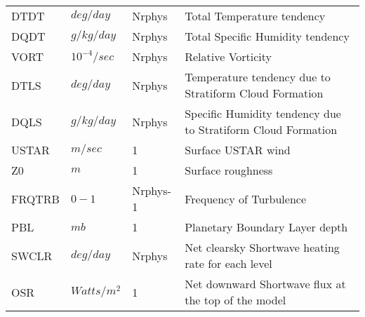 \begin{tabular}{llll}
 DTDT     &    $deg/day$ &  Nrphys
     &\begin{minipage}[t]{3in}
      {Total Temperature tendency}
     \end{minipage}\\
 DQDT     &    $g/kg/day$ &  Nrphys
     &\begin{minipage}[t]{3in}
      {Total Specific Humidity tendency}
     \end{minipage}\\
 VORT     &    $10^{-4}/sec$ &  Nrphys
     &\begin{minipage}[t]{3in}
      {Relative Vorticity}
     \end{minipage}\\
 DTLS     &    $deg/day$ &  Nrphys
     &\begin{minipage}[t]{3in}
      {Temperature tendency due to Stratiform Cloud Formation}
     \end{minipage}\\
 DQLS     &    $g/kg/day$ &  Nrphys
     &\begin{minipage}[t]{3in}
      {Specific Humidity tendency due to Stratiform Cloud Formation}
     \end{minipage}\\
 USTAR    &    $m/sec$ &  1
     &\begin{minipage}[t]{3in}
      {Surface USTAR wind}
     \end{minipage}\\
 Z0       &    $m$ &  1
     &\begin{minipage}[t]{3in}
      {Surface roughness}
     \end{minipage}\\
 FRQTRB   &    $0-1$ &  Nrphys-1
     &\begin{minipage}[t]{3in}
      {Frequency of Turbulence}
     \end{minipage}\\
 PBL      &    $mb$ &  1
     &\begin{minipage}[t]{3in}
      {Planetary Boundary Layer depth}
     \end{minipage}\\
 SWCLR    &  $deg/day$ &  Nrphys 
     &\begin{minipage}[t]{3in}
      {Net clearsky Shortwave heating rate for each level}
     \end{minipage}\\
 OSR      &   $Watts/m^2$  &    1 
     &\begin{minipage}[t]{3in}
      {Net downward Shortwave flux at the top of the model}

\end{minipage}
\end{tabular}

